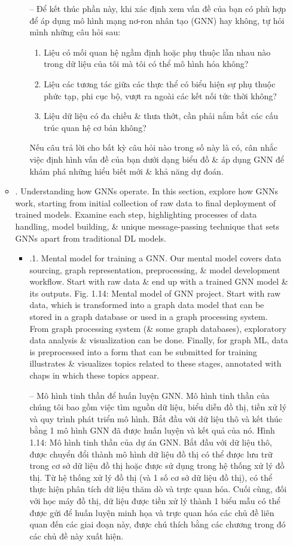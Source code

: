 \documentclass{article}
\begin{document}
\begin{itemize}
\begin{itemize}
\begin{itemize}
            -- Để kết thúc phần này, khi xác định xem vấn đề của bạn có phù hợp để áp dụng mô hình mạng nơ-ron nhân tạo (GNN) hay không, tự hỏi mình những câu hỏi sau:
            \begin{enumerate}
                \item Liệu có mối quan hệ ngầm định hoặc phụ thuộc lẫn nhau nào trong dữ liệu của tôi mà tôi có thể mô hình hóa không?
                \item Liệu các tương tác giữa các thực thể có biểu hiện sự phụ thuộc phức tạp, phi cục bộ, vượt ra ngoài các kết nối tức thời không?
                \item Liệu dữ liệu có đa chiều \& thưa thớt, cần phải nắm bắt các cấu trúc quan hệ cơ bản không?
            \end{enumerate}
            Nếu câu trả lời cho bất kỳ câu hỏi nào trong số này là có, cân nhắc việc định hình vấn đề của bạn dưới dạng biểu đồ \& áp dụng GNN để khám phá những hiểu biết mới \& khả năng dự đoán.
        \end{itemize}
        \item {. Understanding how GNNs operate.} In this section, explore how GNNs work, starting from initial collection of raw data to final deployment of trained models. Examine each step, highlighting processes of data handling, model building, \& unique message-passing technique that sets GNNs apart from traditional DL models.
        \begin{itemize}
            \item {.1. Mental model for training a GNN.} Our mental model covers data sourcing, graph representation, preprocessing, \& model development workflow. Start with raw data \& end up with a trained GNN model \& its outputs. {\sf Fig. 1.14: Mental model of GNN project. Start with raw data, which is transformed into a graph data model that can be stored in a graph database or used in a graph processing system. From graph processing system (\& some graph databases), exploratory data analysis \& visualization can be done. Finally, for graph ML, data is preprocessed into a form that can be submitted for training} illustrates \& visualizes topics related to these stages, annotated with chaps in which these topics appear.

            -- {\sf Mô hình tinh thần để huấn luyện GNN.} Mô hình tinh thần của chúng tôi bao gồm việc tìm nguồn dữ liệu, biểu diễn đồ thị, tiền xử lý và quy trình phát triển mô hình. Bắt đầu với dữ liệu thô và kết thúc bằng 1 mô hình GNN đã được huấn luyện và kết quả của nó. {\sf Hình 1.14: Mô hình tinh thần của dự án GNN. Bắt đầu với dữ liệu thô, được chuyển đổi thành mô hình dữ liệu đồ thị có thể được lưu trữ trong cơ sở dữ liệu đồ thị hoặc được sử dụng trong hệ thống xử lý đồ thị. Từ hệ thống xử lý đồ thị (và 1 số cơ sở dữ liệu đồ thị), có thể thực hiện phân tích dữ liệu thăm dò và trực quan hóa. Cuối cùng, đối với học máy đồ thị, dữ liệu được tiền xử lý thành 1 biểu mẫu có thể được gửi để huấn luyện} minh họa và trực quan hóa các chủ đề liên quan đến các giai đoạn này, được chú thích bằng các chương trong đó các chủ đề này xuất hiện.


\end{itemize}
\end{itemize}
\end{itemize}
\end{document}

